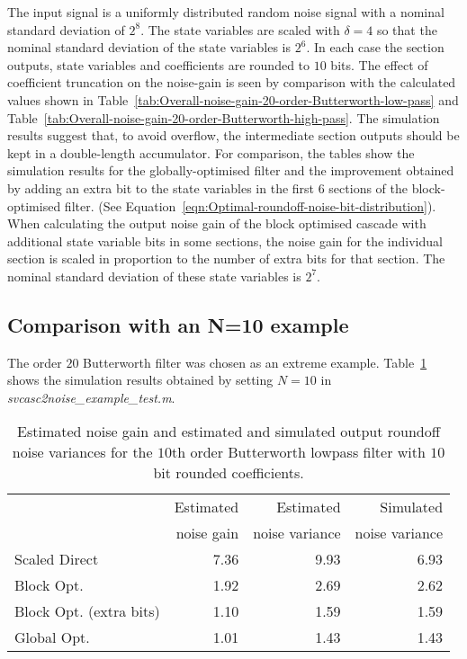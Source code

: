 \documentclass[a4paper,twoside,10pt,english]{report}
\begin{document}
The input signal is a uniformly distributed random noise signal with a nominal
standard deviation of $2^{8}$. The state variables are scaled with $\delta=4$ so
that the nominal standard deviation of the state variables is $2^{6}$. In each 
case the section outputs, state variables and coefficients are rounded to $10$ 
bits. The effect of coefficient truncation on the noise-gain is seen by
 comparison with the calculated values shown in
Table~\ref{tab:Overall-noise-gain-20-order-Butterworth-low-pass} and
Table~\ref{tab:Overall-noise-gain-20-order-Butterworth-high-pass}. The
simulation results suggest that, to avoid overflow, the intermediate section
outputs should be kept in a double-length accumulator. For comparison, the
tables show the simulation results for the globally-optimised filter and the
improvement obtained by adding an extra bit to the state variables in the
first $6$ sections of the block-optimised filter. (See
Equation~\ref{eqn:Optimal-roundoff-noise-bit-distribution}). When
calculating the output noise gain of the block optimised cascade with additional
state variable bits in some sections, the noise gain for the individual section
is scaled in proportion to the number of extra bits for that section. The nominal
standard deviation of these state variables is $2^7$.
\subsection{Comparison with an N=10 example}
The order $20$ Butterworth filter was chosen as an extreme example. 
Table~\ref{tab:Simulated-noise-10-order-Butterworth-low-pass} shows the 
simulation results obtained by setting $N=10$ in 
\emph{svcasc2noise\_example\_test.m}.
\begin{table}[hptb]
\centering
\begin{threeparttable}
\begin{tabular}{lrrr}  \toprule
& Estimated & Estimated & Simulated \\ 
& noise gain & noise variance & noise variance\\ 
\midrule
 Scaled Direct &  7.36 &  9.93 &  6.93 \\ 
 Block Opt.&  1.92 &  2.69 &  2.62 \\ 
 Block Opt. (extra bits) &  1.10 &  1.59 &  1.59 \\ 
 Global Opt. &  1.01 &  1.43 &  1.43 \\ 
\bottomrule
\end{tabular}
\end{threeparttable}
\caption[Butterworth 10th order lowpass noise simulation]{Estimated noise gain and estimated and simulated output roundoff noise variances for the $10$th order Butterworth lowpass filter with $10$ bit rounded coefficients.}
\label{tab:Simulated-noise-10-order-Butterworth-low-pass}
\end{table}
\end{document}
